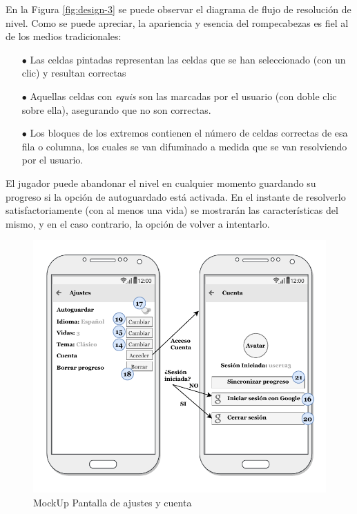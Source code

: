 En la Figura \ref{fig:design-3} se puede observar el diagrama de flujo de resolución
de nivel. 
Como se puede apreciar, la apariencia y esencia del rompecabezas es fiel al de los medios tradicionales:

\begin{itemize}
  \item[$\bullet$] Las celdas pintadas representan las celdas que se han seleccionado (con un clic) y
  resultan correctas
  \item[$\bullet$] Aquellas celdas con \textit{equis} son las marcadas  por el
  usuario (con doble clic sobre ella), asegurando que no son correctas.
  \item[$\bullet$] Los bloques de los extremos contienen el número
  de celdas correctas de esa fila o columna, los cuales se van difuminado a medida que se van
  resolviendo por el usuario.
\end{itemize}

El jugador puede abandonar el nivel en cualquier momento guardando su progreso si la opción de autoguardado
está activada. En el instante de resolverlo satisfactoriamente (con al menos una vida) se mostrarán
las características del mismo, y en el caso contrario, la opción de volver a intentarlo.

\begin{figure}[H]
  \centering
  \includegraphics[scale=0.83]{images/screen5.pdf}
  \caption{MockUp Pantalla de ajustes y cuenta}
  \label{fig:design-4}
\end{figure}

